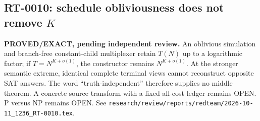 \subsection{RT-0010: schedule obliviousness does not remove $K$}
\textbf{PROVED/EXACT, pending independent review.}
An oblivious simulation and branch-free constant-child multiplexer retain
$T(N)$ up to a logarithmic factor; if $T=N^{K+o(1)}$, the constructor remains
$N^{K+o(1)}$.  At the stronger semantic extreme, identical complete terminal
views cannot reconstruct opposite SAT answers.  The word
``truth-independent'' therefore supplies no middle theorem.  A concrete
source transform with a fixed all-cost ledger remains OPEN.  P versus NP
remains OPEN.  See
\texttt{research/review/reports/redteam/2026-10-11\_1236\_RT-0010.tex}.
